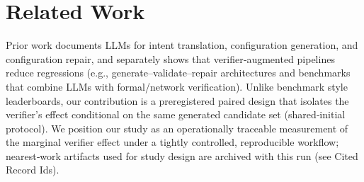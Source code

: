 \documentclass[conference]{IEEEtran}
\begin{document}
\section{Related Work}
Prior work documents LLMs for intent translation, configuration generation, and configuration repair, and separately shows that verifier‑augmented pipelines reduce regressions (e.g., generate--validate--repair architectures and benchmarks that combine LLMs with formal/network verification). Unlike benchmark style leaderboards, our contribution is a preregistered paired design that isolates the verifier's effect conditional on the same generated candidate set (shared‑initial protocol). We position our study as an operationally traceable measurement of the marginal verifier effect under a tightly controlled, reproducible workflow; nearest‑work artifacts used for study design are archived with this run (see Cited Record Ids).
\end{document}
